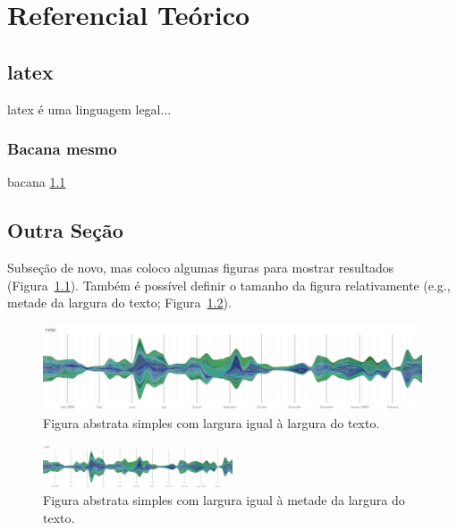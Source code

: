 
\pagestyle{fancy}
\chapter{Referencial Teórico}\label{cap3}

\section{latex}
\label{cap3:latex}

latex é uma linguagem legal...\cite{Adomavicius2005,Stormer2006,Burke2002}


\subsection{Bacana mesmo}%
\label{cap3:bacana}

bacana \ref{cap3:latex}


\section{Outra Seção}
\label{cap3:outra}

Subseção de novo, mas coloco algumas figuras para mostrar resultados (Figura~\ref{fig:last}).
Também é possível definir o tamanho da figura relativamente (e.g., metade da largura do texto; Figura~\ref{fig:last2}).

\begin{figure}[htbp]
    \centering
    \includegraphics[width=\textwidth]{lastgraph}
    \caption[Figura simples]{Figura abstrata simples com largura igual à largura do texto.}
    \label{fig:last}
\end{figure}

\begin{figure}[htbp]
    \centering
    \includegraphics[width=0.5\textwidth]{lastgraph}
    \caption[Outra figura simples]{Figura abstrata simples com largura igual à metade da largura do texto.}
    \label{fig:last2}
\end{figure}

